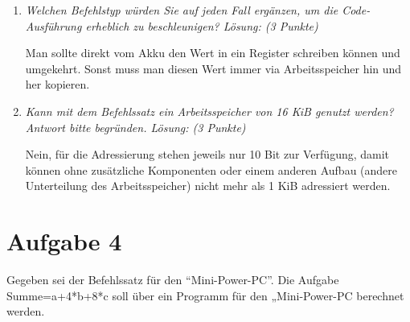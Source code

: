 \documentclass[10pt]{article}
\begin{document}
\begin{enumerate}[label=\alph*)]
	\item
		\textit{Welchen Befehlstyp würden Sie auf jeden Fall ergänzen, um die Code-Ausführung erheblich zu beschleunigen? Lösung: (3 Punkte)}
		
		Man sollte direkt vom Akku den Wert in ein Register schreiben können und umgekehrt. Sonst muss man diesen Wert immer via Arbeitsspeicher hin und her kopieren.
		
	\item
		\textit{Kann mit dem Befehlssatz ein Arbeitsspeicher von 16 KiB genutzt werden? Antwort bitte begründen. Lösung: (3 Punkte)}
		
		Nein, für die Adressierung stehen jeweils nur 10 Bit zur Verfügung, damit können ohne zusätzliche Komponenten oder einem anderen Aufbau (andere Unterteilung des Arbeitsspeicher) nicht mehr als 1 KiB adressiert werden.
			
\end{enumerate}

\newpage

\section*{Aufgabe 4}
Gegeben sei der Befehlssatz für den "`Mini-Power-PC"'. Die Aufgabe Summe=a+4*b+8*c soll über ein Programm für den „Mini-Power-PC berechnet werden.
\end{document}
